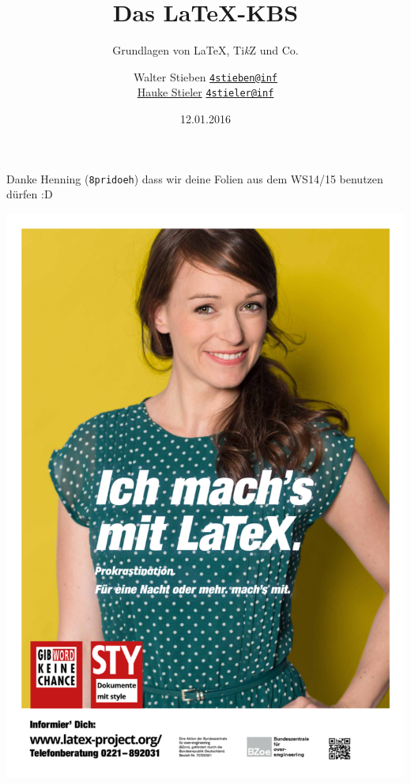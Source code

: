 \documentclass{beamer}
\title{Das \LaTeX-KBS}
\subtitle{\small Grundlagen von \LaTeX, Ti\textit{k}Z und Co.}
\author
{
	Walter Stieben \texttt{\href{mailto:4stieben@informatik.uni-hamburg.de}{4stieben@inf}}\\
	\href{http://hauke-stieler.de/}{Hauke Stieler} \texttt{\href{mailto:4stieler@informatik.uni-hamburg.de}{4stieler@inf}}
}
\date{\footnotesize 12.01.2016}
\begin{document}
	\maketitle
		
		
	\begin{frame}
		\begin{center}
			Danke Henning (\texttt{8pridoeh}) dass wir deine Folien aus dem WS14/15 benutzen dürfen :D
		\end{center}
	\end{frame}
		
		
	\begin{frame}
		\begin{minipage}[0.5\textheight]{0.5\textwidth}
			\tableofcontents
		\end{minipage}
		\begin{minipage}{0.45\textwidth}
			\includegraphics[width=1.05\textwidth]{./images/gib-word-keine-chance}
		\end{minipage}
	\end{frame}
		
\end{document}
